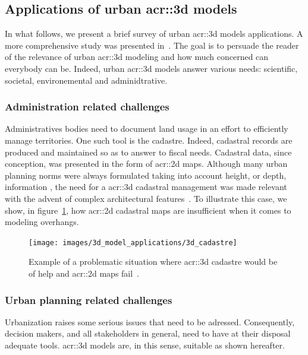    \subsection{Applications of urban \gls*{acr::3d} models}
        \label{subsec::introduction::urban_3d_reconstruction::applications}
        In what follows, we present a brief survey of  urban \gls{acr::3d} models applications.
        A more comprehensive study was presented in~\textcite{ijgi4042842}.
        The goal is to persuade the reader of the relevance of urban \gls{acr::3d} modeling and how much concerned can everybody can be.
        Indeed, urban \gls{acr::3d} models answer various needs: scientific, societal, environemental and adminidtrative.

        \subsubsection{Administration related challenges}
            Administratives bodies need to document land usage in an effort to efficiently manage territories.
            One such tool is the cadastre.
            Indeed, cadastral records are produced and maintained so as to answer to fiscal needs.
            Cadastral data, since conception, was presented in the form of \gls{acr::2d} maps\parencite{billen20033d}.
            Although many urban planning norms were always formulated taking into account height, or depth, information \addref, the need for a \gls{acr::3d} cadastral management was made relevant with the advent of complex architectural features~\textcite{ijgi4042842}.
            To illustrate this case, we show, in figure~\ref{fig::3d_cadastre_need_example}, how \gls{acr::2d} cadastral maps are insufficient when it comes to modeling overhangs.\\
            \begin{figure}[htpb]
                \centering
                \texttt{[image: images/3d\_model\_applications/3d\_cadastre]}            
                \caption{\label{fig::3d_cadastre_need_example} Example of a problematic situation where \gls{acr::3d} cadastre would be of help and \gls{acr::2d} maps fail~\parencite{ijgi4042842}.}
            \end{figure}
        \subsubsection{Urban planning related challenges}
            Urbanization raises some serious issues that need to be adressed.
            Consequently, decision makers, and all stakeholders in general, need to have at their disposal adequate tools.
            \gls{acr::3d} models are, in this sense, suitable as shown hereafter.\\

